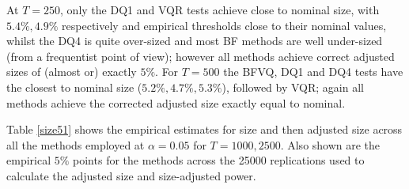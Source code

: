 \documentclass[12pt,epsf]{article}
\begin{document}
At $T=250$, only the DQ1 and VQR tests achieve close to nominal size, with $5.4\%, 4.9\%$ respectively and empirical thresholds close to
their nominal values, whilst the DQ4 is quite over-sized and most BF methods are well under-sized (from a frequentist point of view);
however all methods achieve correct adjusted sizes of (almost or) exactly $5\%$. For $T=500$ the BFVQ, DQ1 and DQ4 tests have the closest to
nominal size ($5.2\%, 4.7\%, 5.3\%$), followed by VQR; again all methods achieve the corrected adjusted size exactly equal to nominal.

Table \ref{size51} shows the empirical estimates for size and then adjusted size across all the methods employed at $\alpha=0.05$
for $T=1000,2500$. Also shown are the empirical $5\%$ points for the methods across the 25000
replications used to calculate the adjusted size and size-adjusted power.
\end{document}
